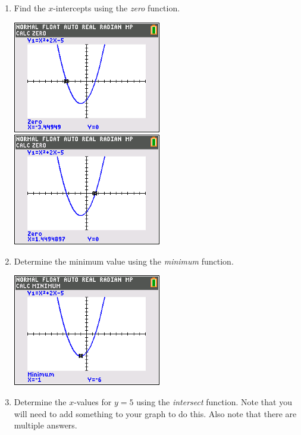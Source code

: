 \documentclass[letterpaper,12pt,fleqn]{article}
\begin{document}
\begin{enumerate}
\begin{enumerate}
  \item Find the \(x\)-intercepts using the \emph{zero} function.

    \includegraphics[scale=0.75]{hw3-2b1}\hspace{0.25in}\includegraphics[scale=0.75]{hw3-2b2}

  \item Determine the minimum value using the \emph{minimum} function.
    
    \includegraphics[scale=0.75]{hw3-2c}
    
  \item Determine the \(x\)-values for \(y=5\) using the \emph{intersect} function.  Note that you will need to add
    something to your graph to do this. Also note that there are multiple answers.
    

\end{enumerate}
\end{enumerate}
\end{document}
